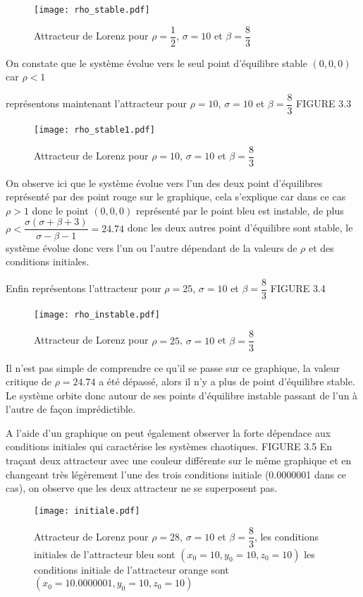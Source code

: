 \begin{figure}
    \texttt{[image: rho\_stable.pdf]}
    \caption{Attracteur de Lorenz pour $\rho=\dfrac{1}{2}$, $\sigma=10$ et $\beta=\dfrac{8}{3}$} 
\end{figure}
On constate que le système évolue vers le seul point d'équilibre stable $(0,0,0)$ car $\rho<1$

représentons maintenant l'attracteur pour $\rho=10$, $\sigma=10$ et $\beta=\dfrac{8}{3}$ FIGURE 3.3

\begin{figure}
    \texttt{[image: rho\_stable1.pdf]}
    \caption{Attracteur de Lorenz pour $\rho=10$, $\sigma=10$ et $\beta=\dfrac{8}{3}$} 
\end{figure}

On observe ici que le système évolue vers l'un des deux point d'équilibres représenté par des point rouge sur le graphique, cela s'explique car dans ce cas $\rho>1$ donc le point $(0,0,0)$ représenté par le point bleu est instable, de plus $\rho < \dfrac{\sigma(\sigma+\beta+3)}{\sigma-\beta-1}=24.74$ donc les deux autres point d'équilibre sont stable, le système évolue donc vers l'un ou l'autre dépendant de la valeurs de $\rho$ et des conditions initiales.  

Enfin représentons l'attracteur pour $\rho=25$, $\sigma=10$ et $\beta=\dfrac{8}{3}$ FIGURE 3.4

\begin{figure}
    \texttt{[image: rho\_instable.pdf]}
    \caption{Attracteur de Lorenz pour $\rho=25$, $\sigma=10$ et $\beta=\dfrac{8}{3}$} 
\end{figure}

Il n'est pas simple de comprendre ce qu'il se passe sur ce graphique, la valeur critique de $\rho=24.74$ a été dépassé, alors il n'y a plus de point d'équilibre stable. Le système orbite donc autour de ses points d'équilibre instable passant de l'un à l'autre de façon imprédictible.

A l'aide d'un graphique on peut également observer la forte dépendace aux conditions initiales qui caractérise les systèmes chaotiques. FIGURE 3.5 En traçant deux attracteur avec une couleur différente sur le même graphique et en changeant très légèrement l'une des trois conditions initiale (0.0000001 dans ce cas), on observe que les deux attracteur ne se superposent pas.

\begin{figure}
    \texttt{[image: initiale.pdf]}
    \caption{Attracteur de Lorenz pour $\rho=28$, $\sigma=10$ et $\beta=\dfrac{8}{3}$, les conditions initiales de l'attracteur bleu sont $(x_0=10,y_0=10,z_0=10)$ les conditions initiale de l'attracteur orange sont $(x_0=10.0000001,y_0=10,z_0=10)$} 
\end{figure}

